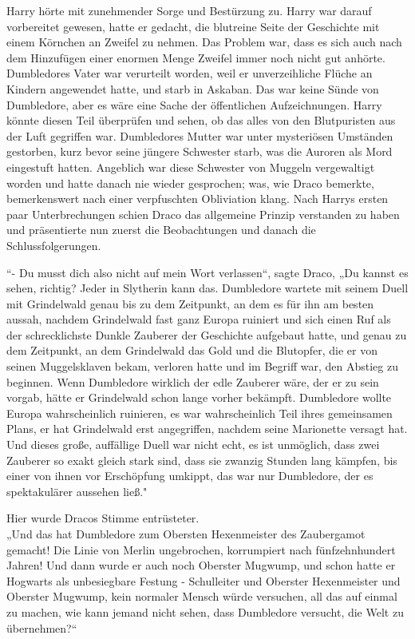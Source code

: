 {Harry hörte mit zunehmender Sorge und Bestürzung zu. Harry war darauf vorbereitet gewesen, hatte er gedacht, die blutreine Seite der Geschichte mit einem Körnchen an Zweifel zu nehmen. Das Problem war, dass es sich auch nach dem Hinzufügen einer enormen Menge Zweifel immer noch nicht gut anhörte. Dumbledores Vater war verurteilt worden, weil er unverzeihliche Flüche an Kindern angewendet hatte, und starb in Askaban. Das war keine Sünde von Dumbledore, aber es wäre eine Sache der öffentlichen Aufzeichnungen. Harry könnte diesen Teil überprüfen und sehen, ob das alles von den Blutpuristen aus der Luft gegriffen war. Dumbledores Mutter war unter mysteriösen Umständen gestorben, kurz bevor seine jüngere Schwester starb, was die Auroren als Mord eingestuft hatten. Angeblich war diese Schwester von Muggeln vergewaltigt worden und hatte danach nie wieder gesprochen; was, wie Draco bemerkte, bemerkenswert nach einer verpfuschten Obliviation klang. Nach Harrys ersten paar Unterbrechungen schien Draco das allgemeine Prinzip verstanden zu haben und präsentierte nun zuerst die Beobachtungen und danach die Schlussfolgerungen.

“- Du musst dich also nicht auf mein Wort verlassen“, sagte Draco, „Du kannst es sehen, richtig? Jeder in Slytherin kann das. Dumbledore wartete mit seinem Duell mit Grindelwald genau bis zu dem Zeitpunkt, an dem es für ihn am besten aussah, nachdem Grindelwald fast ganz Europa ruiniert und sich einen Ruf als der schrecklichste Dunkle Zauberer der Geschichte aufgebaut hatte, und genau zu dem Zeitpunkt, an dem Grindelwald das Gold und die Blutopfer, die er von seinen Muggelsklaven bekam, verloren hatte und im Begriff war, den Abstieg zu beginnen. Wenn Dumbledore wirklich der edle Zauberer wäre, der er zu sein vorgab, hätte er Grindelwald schon lange vorher bekämpft. Dumbledore wollte Europa wahrscheinlich ruinieren, es war wahrscheinlich Teil ihres gemeinsamen Plans, er hat Grindelwald erst angegriffen, nachdem seine Marionette versagt hat. Und dieses große, auffällige Duell war nicht echt, es ist unmöglich, dass zwei Zauberer so exakt gleich stark sind, dass sie zwanzig Stunden lang kämpfen, bis einer von ihnen vor Erschöpfung umkippt, das war nur Dumbledore, der es spektakulärer aussehen ließ."

Hier wurde Dracos Stimme entrüsteter.\\ „Und das hat Dumbledore zum Obersten Hexenmeister des Zaubergamot gemacht! Die Linie von Merlin ungebrochen, korrumpiert nach fünfzehnhundert Jahren! Und dann wurde er auch noch Oberster Mugwump, und schon hatte er Hogwarts als unbesiegbare Festung - Schulleiter und Oberster Hexenmeister und Oberster Mugwump, kein normaler Mensch würde versuchen, all das auf einmal zu machen, wie kann jemand nicht sehen, dass Dumbledore versucht, die Welt zu übernehmen?“

}
